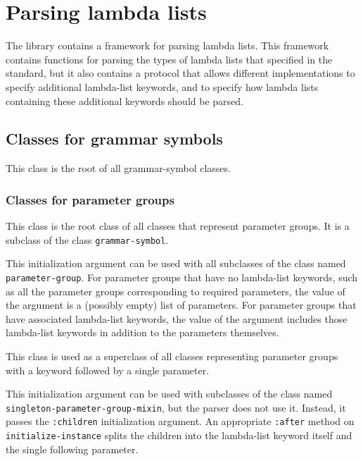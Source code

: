 \chapter{Parsing lambda lists}
\label{chap-user-parsing-lambda-lists}

The \sysname{} library contains a framework for parsing lambda lists.
This framework contains functions for parsing the types of lambda
lists that specified in the \commonlisp{} standard, but it also
contains a protocol that allows different implementations to specify
additional lambda-list keywords, and to specify how lambda lists
containing these additional keywords should be parsed.

\section{Classes for grammar symbols}


This class is the root of all grammar-symbol classes.

\subsection{Classes for parameter groups}


This class is the root class of all classes that represent parameter
groups.  It is a subclass of the class \texttt{grammar-symbol}.


This initialization argument can be used with all subclasses of the
class named \texttt{parameter-group}.  For parameter groups that have
no lambda-list keywords, such as all the parameter groups
corresponding to required parameters, the value of the argument is a
(possibly empty) list of parameters.  For parameter groups that have
associated lambda-list keywords, the value of the argument includes
those lambda-list keywords in addition to the parameters themselves.


This class is used as a superclass of all classes representing
parameter groups with a keyword followed by a single parameter.


This initialization argument can be used with subclasses of the class
named \texttt{singleton-parameter-group-mixin}, but the parser does
not use it.  Instead, it passes the \texttt{:children} initialization
argument.  An appropriate \texttt{:after} method on
\texttt{initialize-instance} splits the children into the lambda-list
keyword itself and the single following parameter.

